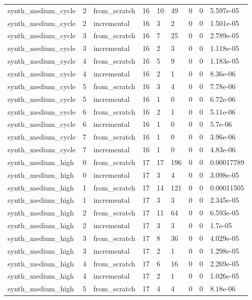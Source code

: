 \begin{table}[t]
\begin{tabular}{lllllllll}
synth\_medium\_cycle & 2 & from\_scratch & 16 & 10 & 49 & 0 & 0 & 5.597e-05 \\
synth\_medium\_cycle & 2 & incremental & 16 & 3 & 2 & 0 & 0 & 1.501e-05 \\
synth\_medium\_cycle & 3 & from\_scratch & 16 & 7 & 25 & 0 & 0 & 2.789e-05 \\
synth\_medium\_cycle & 3 & incremental & 16 & 2 & 3 & 0 & 0 & 1.118e-05 \\
synth\_medium\_cycle & 4 & from\_scratch & 16 & 5 & 9 & 0 & 0 & 1.183e-05 \\
synth\_medium\_cycle & 4 & incremental & 16 & 2 & 1 & 0 & 0 & 8.36e-06 \\
synth\_medium\_cycle & 5 & from\_scratch & 16 & 3 & 4 & 0 & 0 & 7.78e-06 \\
synth\_medium\_cycle & 5 & incremental & 16 & 1 & 0 & 0 & 0 & 6.72e-06 \\
synth\_medium\_cycle & 6 & from\_scratch & 16 & 2 & 1 & 0 & 0 & 5.11e-06 \\
synth\_medium\_cycle & 6 & incremental & 16 & 1 & 0 & 0 & 0 & 5.7e-06 \\
synth\_medium\_cycle & 7 & from\_scratch & 16 & 1 & 0 & 0 & 0 & 3.96e-06 \\
synth\_medium\_cycle & 7 & incremental & 16 & 1 & 0 & 0 & 0 & 4.83e-06 \\
synth\_medium\_high & 0 & from\_scratch & 17 & 17 & 196 & 0 & 0 & 0.00017789 \\
synth\_medium\_high & 0 & incremental & 17 & 3 & 4 & 0 & 0 & 3.098e-05 \\
synth\_medium\_high & 1 & from\_scratch & 17 & 14 & 121 & 0 & 0 & 0.00011505 \\
synth\_medium\_high & 1 & incremental & 17 & 3 & 3 & 0 & 0 & 2.345e-05 \\
synth\_medium\_high & 2 & from\_scratch & 17 & 11 & 64 & 0 & 0 & 6.593e-05 \\
synth\_medium\_high & 2 & incremental & 17 & 3 & 3 & 0 & 0 & 1.7e-05 \\
synth\_medium\_high & 3 & from\_scratch & 17 & 8 & 36 & 0 & 0 & 4.029e-05 \\
synth\_medium\_high & 3 & incremental & 17 & 2 & 1 & 0 & 0 & 1.298e-05 \\
synth\_medium\_high & 4 & from\_scratch & 17 & 6 & 16 & 0 & 0 & 2.269e-05 \\
synth\_medium\_high & 4 & incremental & 17 & 2 & 1 & 0 & 0 & 1.026e-05 \\
synth\_medium\_high & 5 & from\_scratch & 17 & 4 & 4 & 0 & 0 & 8.18e-06 \\

\end{tabular}
\end{table}
